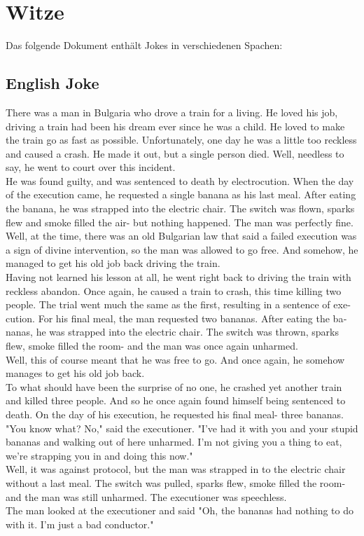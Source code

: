 \documentclass{scrartcl}
\begin{document}
	\section{Witze}
	Das folgende Dokument enthält \textenglish{Jokes} in verschiedenen Spachen:
	\begin{english}
	\subsection{English Joke}
	There was a man in Bulgaria who drove a train for a living.
	He loved his job, driving a train had been his dream ever since he was a child.
	He loved to make the train go as fast as possible.
	Unfortunately, one day he was a little too reckless and caused a crash.
	He made it out, but a single person died.
	Well, needless to say, he went to court over this incident.\\
	He was found guilty, and was sentenced to death by electrocution.
	When the day of the execution came, he requested a single banana as his last meal.
	After eating the banana, he was strapped into the electric chair.
	The switch was flown, sparks flew and smoke filled the air- but nothing happened.
	The man was perfectly fine.\\
	Well, at the time, there was an old Bulgarian law that said a failed execution was a sign of divine intervention, so the man was allowed to go free.
	And somehow, he managed to get his old job back driving the train.\\
	Having not learned his lesson at all, he went right back to driving the train with reckless abandon.
	Once again, he caused a train to crash, this time killing two people.
	The trial went much the same as the first, resulting in a sentence of execution.
	For his final meal, the man requested two bananas.
	After eating the bananas, he was strapped into the electric chair.
	The switch was thrown, sparks flew, smoke filled the room- and the man was once again unharmed.\\
	Well, this of course meant that he was free to go.
	And once again, he somehow manages to get his old job back.\\
	To what should have been the surprise of no one, he crashed yet another train and killed three people.
	And so he once again found himself being sentenced to death.
	On the day of his execution, he requested his final meal- three bananas.
	"You know what? No," said the executioner. "I've had it with you and your stupid bananas and walking out of here unharmed. I'm not giving you a thing to eat, we're strapping you in and doing this now."\\
	Well, it was against protocol, but the man was strapped in to the electric chair without a last meal.
	The switch was pulled, sparks flew, smoke filled the room- and the man was still unharmed.
	The executioner was speechless.\\
	The man looked at the executioner and said "Oh, the bananas had nothing to do with it. I'm just a bad conductor."
	\end{english}
\end{document}
